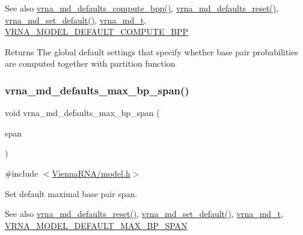 \begin{DoxySeeAlso}{See also}
\mbox{\hyperlink{group__model__details_gaf1b5db10f1f476767f9a95f8a78e3132}{vrna\+\_\+md\+\_\+defaults\+\_\+compute\+\_\+bpp()}}, \mbox{\hyperlink{group__model__details_ga70834424cf804d149937de89f80ceb45}{vrna\+\_\+md\+\_\+defaults\+\_\+reset()}}, \mbox{\hyperlink{group__model__details_ga8ac6ff84936282436f822644bf841f66}{vrna\+\_\+md\+\_\+set\+\_\+default()}}, \mbox{\hyperlink{group__model__details_ga1f8a10e12a0a1915f2a4eff0b28ea17c}{vrna\+\_\+md\+\_\+t}}, \mbox{\hyperlink{group__model__details_ga1d6cd5051940b126c248147c011bac6c}{V\+R\+N\+A\+\_\+\+M\+O\+D\+E\+L\+\_\+\+D\+E\+F\+A\+U\+L\+T\+\_\+\+C\+O\+M\+P\+U\+T\+E\+\_\+\+B\+PP}} 
\end{DoxySeeAlso}
\begin{DoxyReturn}{Returns}
The global default settings that specify whether base pair probabilities are computed together with partition function 
\end{DoxyReturn}
\mbox{\label{group__model__details_ga4c4bc962f09b4480cb8499f1cf8ae4ec}} 
\subsubsection{\texorpdfstring{vrna\+\_\+md\+\_\+defaults\+\_\+max\+\_\+bp\+\_\+span()}{vrna\_md\_defaults\_max\_bp\_span()}}
{\footnotesize\ttfamily void vrna\+\_\+md\+\_\+defaults\+\_\+max\+\_\+bp\+\_\+span (\begin{DoxyParamCaption}\item[{int}]{span }\end{DoxyParamCaption})}



{\ttfamily \#include $<$\mbox{\hyperlink{model_8h}{Vienna\+R\+N\+A/model.\+h}}$>$}



Set default maximal base pair span. 

\begin{DoxySeeAlso}{See also}
\mbox{\hyperlink{group__model__details_ga70834424cf804d149937de89f80ceb45}{vrna\+\_\+md\+\_\+defaults\+\_\+reset()}}, \mbox{\hyperlink{group__model__details_ga8ac6ff84936282436f822644bf841f66}{vrna\+\_\+md\+\_\+set\+\_\+default()}}, \mbox{\hyperlink{group__model__details_ga1f8a10e12a0a1915f2a4eff0b28ea17c}{vrna\+\_\+md\+\_\+t}}, \mbox{\hyperlink{group__model__details_ga7cb6f4ae8fdebff6746a4410814f2977}{V\+R\+N\+A\+\_\+\+M\+O\+D\+E\+L\+\_\+\+D\+E\+F\+A\+U\+L\+T\+\_\+\+M\+A\+X\+\_\+\+B\+P\+\_\+\+S\+P\+AN}} 
\end{DoxySeeAlso}

